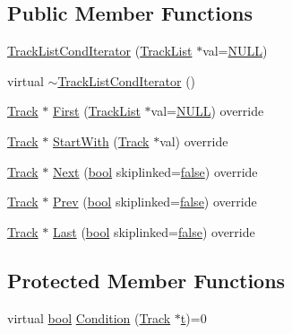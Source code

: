 \subsection*{Public Member Functions}
\begin{DoxyCompactItemize}
\item 
\hyperlink{class_track_list_cond_iterator_ae087efb861e158edaf05040659092900}{Track\+List\+Cond\+Iterator} (\hyperlink{class_track_list}{Track\+List} $\ast$val=\hyperlink{px__mixer_8h_a070d2ce7b6bb7e5c05602aa8c308d0c4}{N\+U\+LL})
\item 
virtual \hyperlink{class_track_list_cond_iterator_a6fe42b930d61f0b671739f66ba7b58a5}{$\sim$\+Track\+List\+Cond\+Iterator} ()
\item 
\hyperlink{class_track}{Track} $\ast$ \hyperlink{class_track_list_cond_iterator_a1b09130ef5d92e19a60db05933d89ad5}{First} (\hyperlink{class_track_list}{Track\+List} $\ast$val=\hyperlink{px__mixer_8h_a070d2ce7b6bb7e5c05602aa8c308d0c4}{N\+U\+LL}) override
\item 
\hyperlink{class_track}{Track} $\ast$ \hyperlink{class_track_list_cond_iterator_a76bdf28da57b0da798563d6dfb3c347e}{Start\+With} (\hyperlink{class_track}{Track} $\ast$val) override
\item 
\hyperlink{class_track}{Track} $\ast$ \hyperlink{class_track_list_cond_iterator_a9e3f44333f6cc2d0171315d389fb6582}{Next} (\hyperlink{mac_2config_2i386_2lib-src_2libsoxr_2soxr-config_8h_abb452686968e48b67397da5f97445f5b}{bool} skiplinked=\hyperlink{mac_2config_2i386_2lib-src_2libsoxr_2soxr-config_8h_a65e9886d74aaee76545e83dd09011727}{false}) override
\item 
\hyperlink{class_track}{Track} $\ast$ \hyperlink{class_track_list_cond_iterator_a7eb9773d921f02cb3af1f674ca89b6a8}{Prev} (\hyperlink{mac_2config_2i386_2lib-src_2libsoxr_2soxr-config_8h_abb452686968e48b67397da5f97445f5b}{bool} skiplinked=\hyperlink{mac_2config_2i386_2lib-src_2libsoxr_2soxr-config_8h_a65e9886d74aaee76545e83dd09011727}{false}) override
\item 
\hyperlink{class_track}{Track} $\ast$ \hyperlink{class_track_list_cond_iterator_abf53bb5c398f4fde2ee09fd13a37322e}{Last} (\hyperlink{mac_2config_2i386_2lib-src_2libsoxr_2soxr-config_8h_abb452686968e48b67397da5f97445f5b}{bool} skiplinked=\hyperlink{mac_2config_2i386_2lib-src_2libsoxr_2soxr-config_8h_a65e9886d74aaee76545e83dd09011727}{false}) override
\end{DoxyCompactItemize}
\subsection*{Protected Member Functions}
\begin{DoxyCompactItemize}
\item 
virtual \hyperlink{mac_2config_2i386_2lib-src_2libsoxr_2soxr-config_8h_abb452686968e48b67397da5f97445f5b}{bool} \hyperlink{class_track_list_cond_iterator_a0ea9566790170e50bace91fbecfb2a4b}{Condition} (\hyperlink{class_track}{Track} $\ast$\hyperlink{octave__test_8m_aaccc9105df5383111407fd5b41255e23}{t})=0
\end{DoxyCompactItemize}
